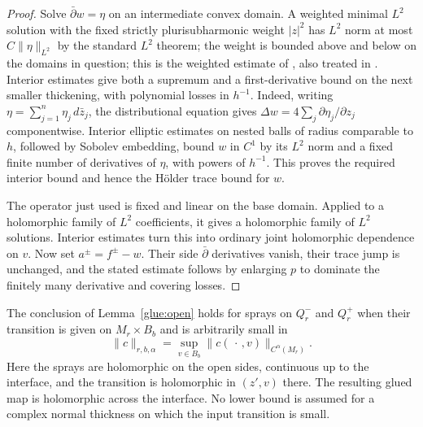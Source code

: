 \begin{proof}
Solve $\bar\partial w=\eta$ on an intermediate convex domain. A weighted
minimal $L^2$ solution with the fixed strictly plurisubharmonic weight
$|z|^2$ has $L^2$ norm at most $C\|\eta\|_{L^2}$ by the standard
$L^2$ theorem; the weight is bounded above and below on the domains in
question; this is the weighted estimate of
\cite[Theorem~2.2.1$'$]{HormanderLTwo}, also treated in
\cite{Hormander,Forstneric}. Interior estimates give both a
supremum and a first-derivative bound on the next smaller thickening,
with polynomial losses in $h^{-1}$. Indeed, writing
$\eta=\sum_{j=1}^n\eta_j\,d\bar z_j$, the distributional equation gives
$\Delta w=4\sum_j\partial\eta_j/\partial z_j$ componentwise.
Interior elliptic estimates on nested balls of radius comparable to
$h$, followed by Sobolev embedding, bound $w$ in $C^1$ by its $L^2$
norm and a fixed finite number of derivatives of $\eta$, with powers
of $h^{-1}$. This proves the required interior bound and hence the
H\"older trace bound for $w$.

The operator just used is fixed and linear on the base domain.
Applied to a holomorphic family of $L^2$ coefficients, it gives a
holomorphic family of $L^2$ solutions. Interior estimates turn this into
ordinary joint holomorphic dependence on $v$. Now set
$a^\pm=f^\pm-w$. Their side $\bar\partial$ derivatives vanish, their
trace jump is unchanged, and the stated estimate follows by enlarging
$p$ to dominate the finitely many derivative and covering losses.
\end{proof}

\begin{lemma}\label{glue:trace}
The conclusion of Lemma~\ref{glue:open} holds for sprays on
$Q_r^-$ and $Q_r^+$ when their transition is
given on $M_r\times B_b$ and is arbitrarily small in
\[
 \|c\|_{r,b,\alpha}
       =\sup_{v\in B_b}\|c(\,\cdot\,,v)\|_{C^\alpha(M_r)}.
\]
Here the sprays are holomorphic on the open sides, continuous up to the
interface, and the transition is holomorphic in $(z',v)$ there. The
resulting glued map is holomorphic across the interface. No lower bound
is assumed for a complex normal thickness on which the input transition
is small.
\end{lemma}

